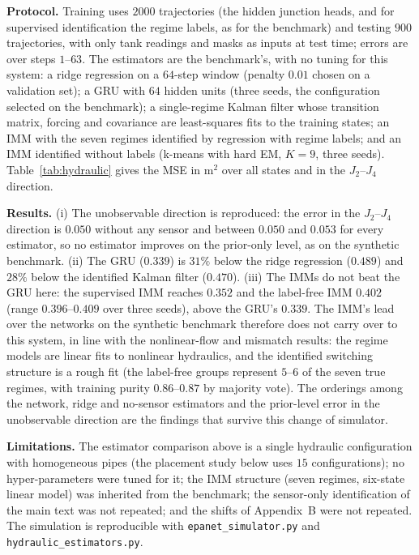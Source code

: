 \documentclass[conference]{IEEEtran}
\begin{document}
\textbf{Protocol.} Training uses $2000$ trajectories (the hidden junction heads, and for supervised identification the regime labels, as for the benchmark) and testing $900$ trajectories, with only tank readings and masks as inputs at test time; errors are over steps $1$--$63$. The estimators are the benchmark's, with no tuning for this system: a ridge regression on a $64$-step window (penalty $0.01$ chosen on a validation set); a GRU with $64$ hidden units (three seeds, the configuration selected on the benchmark); a single-regime Kalman filter whose transition matrix, forcing and covariance are least-squares fits to the training states; an IMM with the seven regimes identified by regression with regime labels; and an IMM identified without labels (k-means with hard EM, $K=9$, three seeds). Table~\ref{tab:hydraulic} gives the MSE in m$^2$ over all states and in the $J_2$--$J_4$ direction.

\textbf{Results.} (i) The unobservable direction is reproduced: the error in the $J_2$--$J_4$ direction is $0.050$ without any sensor and between $0.050$ and $0.053$ for every estimator, so no estimator improves on the prior-only level, as on the synthetic benchmark. (ii) The GRU ($0.339$) is $31\%$ below the ridge regression ($0.489$) and $28\%$ below the identified Kalman filter ($0.470$). (iii) The IMMs do not beat the GRU here: the supervised IMM reaches $0.352$ and the label-free IMM $0.402$ (range $0.396$--$0.409$ over three seeds), above the GRU's $0.339$. The IMM's lead over the networks on the synthetic benchmark therefore does not carry over to this system, in line with the nonlinear-flow and mismatch results: the regime models are linear fits to nonlinear hydraulics, and the identified switching structure is a rough fit (the label-free groups represent $5$--$6$ of the seven true regimes, with training purity $0.86$--$0.87$ by majority vote). The orderings among the network, ridge and no-sensor estimators and the prior-level error in the unobservable direction are the findings that survive this change of simulator.

\textbf{Limitations.} The estimator comparison above is a single hydraulic configuration with homogeneous pipes (the placement study below uses $15$ configurations); no hyper-parameters were tuned for it; the IMM structure (seven regimes, six-state linear model) was inherited from the benchmark; the sensor-only identification of the main text was not repeated; and the shifts of Appendix~B were not repeated. The simulation is reproducible with \texttt{epanet\_simulator.py} and \texttt{hydraulic\_estimators.py}.
\end{document}
